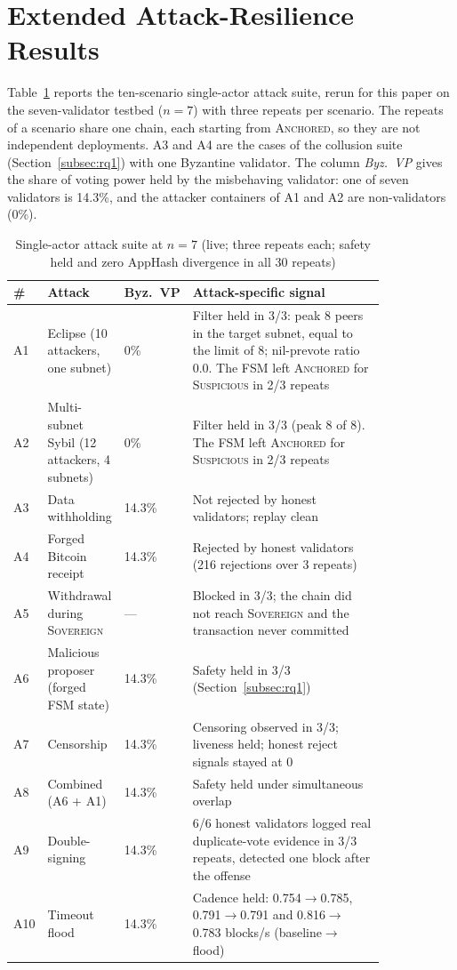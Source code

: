 \section{Extended Attack-Resilience Results}
\label{app:attacks}

Table~\ref{tab:attack-full} reports the ten-scenario single-actor attack
suite, rerun for this paper on the seven-validator testbed ($n{=}7$) with
three repeats per scenario. The repeats of a scenario share one chain, each starting
from \textsc{Anchored}, so they are not independent deployments. A3 and A4 are
the cases of the collusion suite (Section~\ref{subsec:rq1}) with one Byzantine
validator. The column \emph{Byz.\ VP} gives the share of voting power held by
the misbehaving validator: one of seven validators is 14.3\%, and the attacker
containers of A1 and A2 are non-validators (0\%).

\begin{table}[H]
\caption{Single-actor attack suite at $n{=}7$ (live; three repeats each; safety
held and zero AppHash divergence in all 30 repeats)}
\label{tab:attack-full}
\centering
\footnotesize
\begin{tabular}{@{}p{0.04\linewidth}p{0.17\linewidth}p{0.07\linewidth}p{0.55\linewidth}@{}}
\toprule
\textbf{\#} & \textbf{Attack} & \textbf{Byz.\ VP} & \textbf{Attack-specific signal} \\
\midrule
A1 & Eclipse (10 attackers, one subnet) & 0\% & Filter held in 3/3: peak 8 peers in the target subnet, equal to the limit of 8; nil-prevote ratio 0.0. The FSM left \textsc{Anchored} for \textsc{Suspicious} in 2/3 repeats \\
A2 & Multi-subnet Sybil (12 attackers, 4 subnets) & 0\% & Filter held in 3/3 (peak 8 of 8). The FSM left \textsc{Anchored} for \textsc{Suspicious} in 2/3 repeats \\
A3 & Data withholding & 14.3\% & Not rejected by honest validators; replay clean \\
A4 & Forged Bitcoin receipt & 14.3\% & Rejected by honest validators (216 rejections over 3 repeats) \\
A5 & Withdrawal during \textsc{Sovereign} & --- & Blocked in 3/3; the chain did not reach \textsc{Sovereign} and the transaction never committed \\
A6 & Malicious proposer (forged FSM state) & 14.3\% & Safety held in 3/3 (Section~\ref{subsec:rq1}) \\
A7 & Censorship & 14.3\% & Censoring observed in 3/3; liveness held; honest reject signals stayed at 0 \\
A8 & Combined (A6 + A1) & 14.3\% & Safety held under simultaneous overlap \\
A9 & Double-signing & 14.3\% & 6/6 honest validators logged real duplicate-vote evidence in 3/3 repeats, detected one block after the offense \\
A10 & Timeout flood & 14.3\% & Cadence held: 0.754$\to$0.785, 0.791$\to$0.791 and 0.816$\to$0.783 blocks/s (baseline$\to$flood) \\
\bottomrule
\end{tabular}
\end{table}

